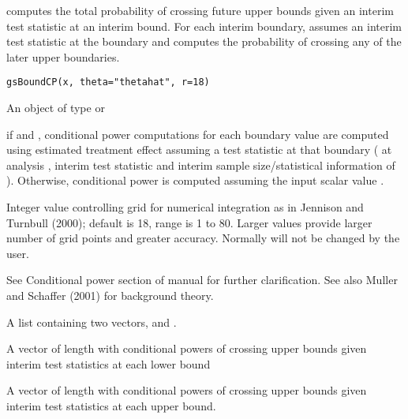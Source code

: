 \begin{Description}\relax
{} computes the total probability of crossing future upper bounds given an interim test statistic at an interim bound.
For each interim boundary, assumes an interim test statistic at the boundary and
computes the probability of crossing any of the later upper boundaries.
\end{Description}
\begin{Usage}
\begin{verbatim}
gsBoundCP(x, theta="thetahat", r=18)
\end{verbatim}
\end{Usage}
\begin{Arguments}
\begin{ldescription}
\item[\code{x}] An object of type  or 
\item[\code{theta}] if  and , conditional power computations for each boundary value are computed using estimated treatment effect assuming a test statistic at that boundary
( at analysis , interim test statistic  and interim sample size/statistical information of ). Otherwise, conditional power is computed assuming the input scalar value .

\item[\code{r}] Integer value controlling grid for numerical integration as in Jennison and Turnbull (2000); 
default is 18, range is 1 to 80. 
Larger values provide larger number of grid points and greater accuracy.
Normally  will not be changed by the user.
\end{ldescription}
\end{Arguments}
\begin{Details}\relax
See Conditional power section of manual for further clarification. See also Muller and Schaffer (2001) for background theory.
\end{Details}
\begin{Value}
A list containing two vectors,  and .
\begin{ldescription}
\item[\code{CPlo}] A vector of length  with conditional powers of crossing upper bounds
given interim test statistics at each lower bound
\item[\code{CPhi}] A vector of length  with conditional powers of crossing upper bounds
given interim test statistics at each upper bound.
\end{ldescription}
\end{Value}
